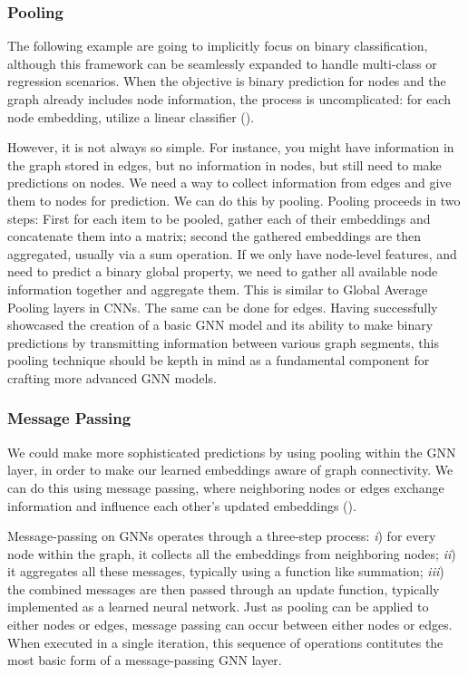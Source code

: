 \documentclass[binding=0.6cm]{sapthesis}
\newcommand{\mycite}[1]{(\cite{#1})}
\begin{document}
\subsubsection{Pooling}
\label{sec:bg.gnn.graph-pooling}
The following example are going to implicitly focus on binary classification, although this framework can be seamlessly expanded to handle multi-class or regression scenarios. When the objective is binary prediction for nodes and the graph already includes node information, the process is uncomplicated: for each node embedding, utilize a linear classifier \mycite{daigavane2021-conv-on-graphs}. 

However, it is not always so simple. For instance, you might have information in the graph stored in edges, but no information in nodes, but still need to make predictions on nodes. We need a way to collect information from edges and give them to nodes for prediction. We can do this by pooling. Pooling proceeds in two steps: First for each item to be pooled, gather each of their embeddings and concatenate them into a matrix; second the gathered embeddings are then aggregated, usually via a sum operation. If we only have node-level features, and need to predict a binary global property, we need to gather all available node information together and aggregate them. This is similar to Global Average Pooling layers in CNNs. The same can be done for edges. Having successfully showcased the creation of a basic GNN model and its ability to make binary predictions by transmitting information between various graph segments, this pooling technique should be kepth in mind as a fundamental component for crafting more advanced GNN models.

\subsubsection{Message Passing}
\label{sec:bg.gnn.message-passing}
We could make more sophisticated predictions by using pooling within the GNN layer, in order to make our learned embeddings aware of graph connectivity. We can do this using message passing, where neighboring nodes or edges exchange information and influence each other’s updated embeddings \mycite{gilmer2017-message-passing}.

Message-passing on GNNs operates through a three-step process: \textit{i}) for every node within the graph, it collects all the embeddings from neighboring nodes; \textit{ii}) it aggregates all these messages, typically using a function like summation; \textit{iii}) the combined messages are then passed through an update function, typically implemented as a learned neural network. Just as pooling can be applied to either nodes or edges, message passing can occur between either nodes or edges. When executed in a single iteration, this sequence of operations contitutes the most basic form of a message-passing GNN layer.
\end{document}
